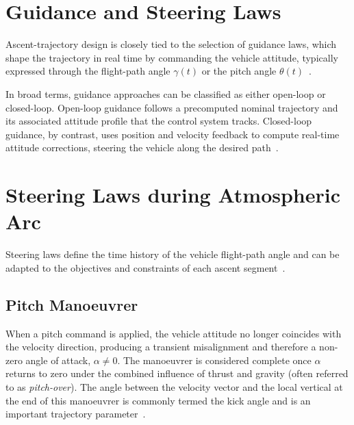 \section{Guidance and Steering Laws}

Ascent-trajectory design is closely tied to the selection of guidance laws, which shape the trajectory in real time by commanding the vehicle attitude, typically expressed through the flight-path angle $\gamma(t)$ or the pitch angle $\theta(t)$~\cite{suresh2015integrated}.

In broad terms, guidance approaches can be classified as either open-loop or closed-loop. Open-loop guidance follows a precomputed nominal trajectory and its associated attitude profile that the control system tracks. Closed-loop guidance, by contrast, uses position and velocity feedback to compute real-time attitude corrections, steering the vehicle along the desired path~\cite{suresh2015integrated}.


\section{Steering Laws during Atmospheric Arc}

Steering laws define the time history of the vehicle flight-path angle and can be adapted to the objectives and constraints of each ascent segment~\cite{Ulrich}.


\subsection{Pitch Manoeuvrer}

When a pitch command is applied, the vehicle attitude no longer coincides with the velocity direction, producing a transient misalignment and therefore a non-zero angle of attack, $\alpha \neq 0$. The manoeuvrer is considered complete once $\alpha$ returns to zero under the combined influence of thrust and gravity (often referred to as \emph{pitch-over}). The angle between the velocity vector and the local vertical at the end of this manoeuvrer is commonly termed the kick angle and is an important trajectory parameter~\cite{teofilatto2025trajectories}.

